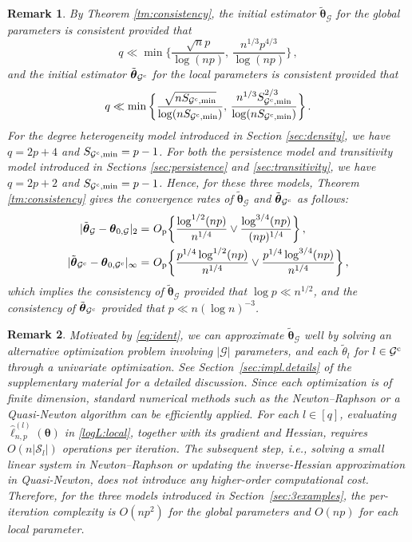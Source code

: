 \documentclass[12pt]{article}
\newtheorem{remark}{Remark}
\newcommand{\btheta}{\boldsymbol \theta}
\newcommand{\btc}{{\rm c}}
\newcommand{\0}{{\bf 0}}
\begin{document}
\begin{remark} \label{rm:consistency}
By Theorem {\rm\ref{tm:consistency}},  the initial estimator $\tilde{\btheta}_{\mathcal{G}}$ for the global parameters is consistent provided that 
\[
q\ll \min\bigg\{\frac{\sqrt{n}p}{\log(np)},\,\frac{n^{1/3}p^{4/3}}{\log(np)}\bigg\}\,,
\]
and  the initial estimator $\tilde{\btheta}_{\mathcal{G}^{\btc}}$ for the local parameters is consistent provided that
\[
q\ll \min\bigg\{\frac{\sqrt{nS_{\mathcal{G}^{\btc},\min}}}{\log(nS_{\mathcal{G}^{\btc},\min})},\,\frac{n^{1/3}S_{\mathcal{G}^{\btc},\min}^{2/3}}{\log(nS_{\mathcal{G}^{\btc},\min})}\bigg\}\,.
\]
For the degree heterogeneity model introduced in Section {\rm\ref{sec:density}}, we have $q=2p+4$ and $S_{\mathcal{G}^{\btc},\min}=p-1$. For both the persistence model and transitivity model introduced in Sections {\rm\ref{sec:persistence}} and {\rm\ref{sec:transitivity}}, we have $q=2p+2$ and $S_{\mathcal{G}^{\btc},\min}=p-1$. Hence, for these three models, Theorem {\rm\ref{tm:consistency}} gives the convergence rates of $\tilde{\btheta}_{\mathcal{G}}$ and $\tilde{\btheta}_{\mathcal{G}^{\btc}}$ as follows: 
\begin{align*}
|\tilde{\btheta}_{\mathcal{G}}-\btheta_{0,\mathcal{G}}|_2=&~ O_{\rm p}\bigg\{\frac{\log^{1/2}(np)}{n^{1/4}}\vee\frac{\log^{3/4}(np)}{(np)^{1/4}}\bigg\}\,,  \\
|\tilde{\btheta}_{\mathcal{G}^{\btc}}-\btheta_{0,\mathcal{G}^{\btc}}|_\infty=&~ O_{\rm p}\bigg\{\frac{p^{1/4}\log^{1/2}(np)}{n^{1/4}}\vee\frac{p^{1/4}\log^{3/4}(np)}{n^{1/4}}\bigg\}\,,
\end{align*}
which implies the consistency of $\tilde{\btheta}_{\mathcal{G}}$ provided that $\log p \ll n^{1/2}$, and the consistency of $\tilde{\btheta}_{\mathcal{G}^{\btc}}$ provided that $p\ll n(\log n)^{-3}$. 
\end{remark}
\begin{remark} \label{rmk.complexity}
Motivated by \eqref{eq:ident}, we can approximate $\tilde{\btheta}_{\mathcal{G}}$ well by
solving an alternative optimization problem involving $|\mathcal{G}|$ parameters, and each $\tilde{\theta}_l$ for $l\in\mathcal{G}^{\btc}$ through a univariate optimization. See Section~{\rm\ref{sec:impl.details}} of the supplementary material for a detailed discussion. Since each optimization is of finite dimension, standard numerical methods such as the Newton–Raphson or a Quasi-Newton algorithm can be efficiently applied. For each $l \in [q]$,
evaluating $\hat{\ell}_{n,p}^{(l)}(\btheta)$ in \eqref{logL:local}, together with its gradient and Hessian, requires $O(n|\mathcal{S}_l|)$ operations per iteration. The subsequent step, i.e., solving a small linear system in Newton--Raphson or updating the inverse-Hessian approximation in Quasi-Newton, does not introduce any higher-order computational cost.
Therefore, for the three models  introduced in Section~{\rm\ref{sec:3examples}}, the per-iteration complexity is $O(np^2)$ for the global parameters and $O(np)$ for each local parameter.
\end{remark}
\end{document}
